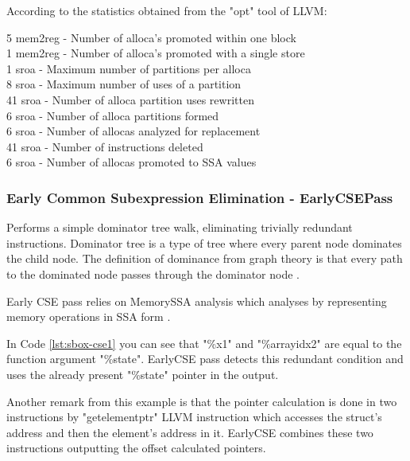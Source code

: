 According to the statistics obtained from the "opt" tool of LLVM:

\begin{displayquote}
 5 mem2reg - Number of alloca's promoted within one block \\
 1 mem2reg - Number of alloca's promoted with a single store \\
 1 sroa    - Maximum number of partitions per alloca \\
 8 sroa    - Maximum number of uses of a partition \\
41 sroa    - Number of alloca partition uses rewritten \\
 6 sroa    - Number of alloca partitions formed \\
 6 sroa    - Number of allocas analyzed for replacement \\
41 sroa    - Number of instructions deleted \\
 6 sroa    - Number of allocas promoted to SSA values \\
\end{displayquote}

\subsubsection{Early Common Subexpression Elimination - EarlyCSEPass}\label{sec:earlyCSE1}
Performs a simple dominator tree walk, eliminating trivially redundant instructions. Dominator tree is a type of tree where every parent node dominates the child node. The definition of dominance from graph theory is that every path to the dominated node passes through the dominator node \cite{prosserDom}.

Early CSE pass relies on MemorySSA analysis which analyses by representing memory operations in SSA form \cite{llvmdoc-memoryssa, novillo2007memory}.

 
In Code \ref{lst:sbox-cse1} you can see that "\%x1" and "\%arrayidx2" are equal to the function argument "\%state". EarlyCSE pass detects this redundant condition and uses the already present "\%state" pointer in the output.



Another remark from this example is that the pointer calculation is done in two instructions by "getelementptr" LLVM instruction which accesses the struct's address and then the element's address in it. EarlyCSE combines these two instructions outputting the offset calculated pointers.

